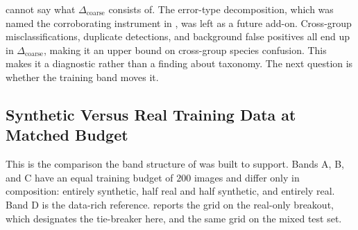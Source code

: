 cannot say what $\Delta_{\text{coarse}}$ consists of. The error-type decomposition, which was named the corroborating instrument in , was left as a future add-on.
Cross-group misclassifications, duplicate detections, and background false positives all end up in $\Delta_{\text{coarse}}$, making it an upper bound on cross-group species confusion. This makes it a diagnostic rather than a finding about taxonomy. The next question is whether the training band moves it.

\subsection{Synthetic Versus Real Training Data at Matched Budget}\label{sec:results_band_granularity}

This is the comparison the band structure of  was built to support. Bands A, B, and C have an equal training budget of $200$ images and differ only in composition: entirely synthetic, half real and half synthetic, and entirely real. Band D is the data-rich reference.  reports the grid on the real-only breakout, which  designates the tie-breaker here, and  the same grid on the mixed test set.

